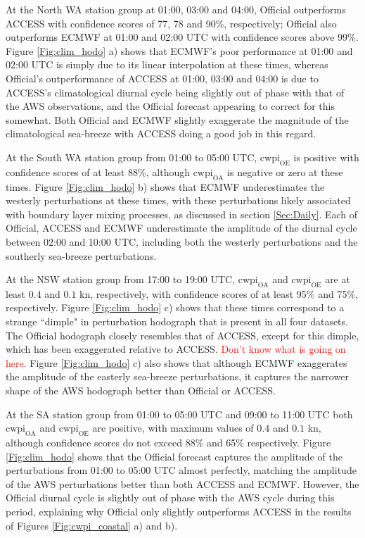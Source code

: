 \documentclass[alpha-refs]{wiley-article}
\begin{document}
At the North WA station group at 01:00, 03:00 and 04:00, Official outperforms ACCESS with confidence scores of 77, 78 and 90\%, respectively; Official also outperforms ECMWF at 01:00 and 02:00 UTC with confidence scores above 99\%. Figure \ref{Fig:clim_hodo} a) shows that ECMWF's poor performance at 01:00 and 02:00 UTC is simply due to its linear interpolation at these times, whereas Official's outperformance of ACCESS at 01:00, 03:00 and 04:00 is due to ACCESS's climatological diurnal cycle being slightly out of phase with that of the AWS observations, and the Official forecast appearing to correct for this somewhat. Both Official and ECMWF slightly exaggerate the magnitude of the climatological sea-breeze with ACCESS doing a good job in this regard.    

At the South WA station group from 01:00 to 05:00 UTC, $\text{cwpi}_\text{OE}$ is positive with confidence scores of at least $88\%$, although $\text{cwpi}_\text{OA}$ is negative or zero at these times. Figure \ref{Fig:clim_hodo} b) shows that ECMWF underestimates the westerly perturbations at these times, with these perturbations likely associated with boundary layer mixing processes, as discussed in section \ref{Sec:Daily}. Each of Official, ACCESS and ECMWF underestimate the amplitude of the diurnal cycle between 02:00 and 10:00 UTC, including both the westerly perturbations and the southerly sea-breeze perturbations. 

At the NSW station group from 17:00 to 19:00 UTC, $\text{cwpi}_\text{OA}$ and $\text{cwpi}_\text{OE}$ are at least $0.4$ and $0.1$ kn, respectively, with confidence scores of at least 95\% and 75\%, respectively. Figure \ref{Fig:clim_hodo} c) shows that these times correspond to a strange ``dimple" in perturbation hodograph that is present in all four datasets. The Official hodograph closely resembles that of ACCESS, except for this dimple, which has been exaggerated relative to ACCESS. \textcolor{red}{Don't know what is going on here.} Figure \ref{Fig:clim_hodo} c) also shows that although ECMWF exaggerates the amplitude of the easterly sea-breeze perturbations, it captures the narrower shape of the AWS hodograph better than Official or ACCESS. 

At the SA station group from 01:00 to 05:00 UTC and 09:00 to 11:00 UTC both $\text{cwpi}_\text{OA}$ and $\text{cwpi}_\text{OE}$ are positive, with maximum values of $0.4$ and $0.1$ kn, although confidence scores do not exceed 88\% and 65\% respectively. Figure \ref{Fig:clim_hodo} shows that the Official forecast captures the amplitude of the perturbations from 01:00 to 05:00 UTC almost perfectly, matching the amplitude of the AWS perturbations better than both ACCESS and ECMWF. However, the Official diurnal cycle is slightly out of phase with the AWS cycle during this period, explaining why Official only slightly outperforms ACCESS in the results of Figures \ref{Fig:cwpi_coastal} a) and b).      
\end{document}
